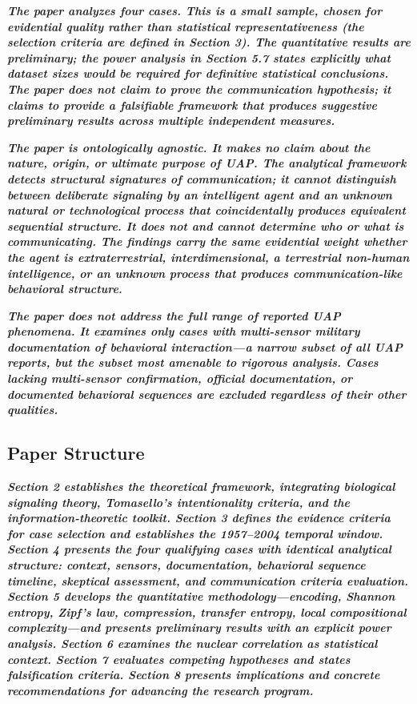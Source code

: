 \documentclass[11pt,letterpaper]{article}
\begin{document}
\textbf{\textit{The paper analyzes four cases. This is a small sample, chosen for evidential quality rather than statistical representativeness (the selection criteria are defined in Section 3). The quantitative results are preliminary; the power analysis in Section 5.7 states explicitly what dataset sizes would be required for definitive statistical conclusions. The paper does not claim to prove the communication hypothesis; it claims to provide a falsifiable framework that produces suggestive preliminary results across multiple independent measures.}}


\textbf{\textit{The paper is ontologically agnostic. It makes no claim about the nature, origin, or ultimate purpose of UAP. The analytical framework detects structural signatures of communication; it cannot distinguish between deliberate signaling by an intelligent agent and an unknown natural or technological process that coincidentally produces equivalent sequential structure. It does not and cannot determine who or what is communicating. The findings carry the same evidential weight whether the agent is extraterrestrial, interdimensional, a terrestrial non-human intelligence, or an unknown process that produces communication-like behavioral structure.}}


\textbf{\textit{The paper does not address the full range of reported UAP phenomena. It examines only cases with multi-sensor military documentation of behavioral interaction---a narrow subset of all UAP reports, but the subset most amenable to rigorous analysis. Cases lacking multi-sensor confirmation, official documentation, or documented behavioral sequences are excluded regardless of their other qualities.}}


\subsection{Paper Structure}

\textbf{\textit{Section 2 establishes the theoretical framework, integrating biological signaling theory, Tomasello's intentionality criteria, and the information-theoretic toolkit. Section 3 defines the evidence criteria for case selection and establishes the 1957--2004 temporal window. Section 4 presents the four qualifying cases with identical analytical structure: context, sensors, documentation, behavioral sequence timeline, skeptical assessment, and communication criteria evaluation. Section 5 develops the quantitative methodology---encoding, Shannon entropy, Zipf's law, compression, transfer entropy, local compositional complexity---and presents preliminary results with an explicit power analysis. Section 6 examines the nuclear correlation as statistical context. Section 7 evaluates competing hypotheses and states falsification criteria. Section 8 presents implications and concrete recommendations for advancing the research program.}}
\end{document}
